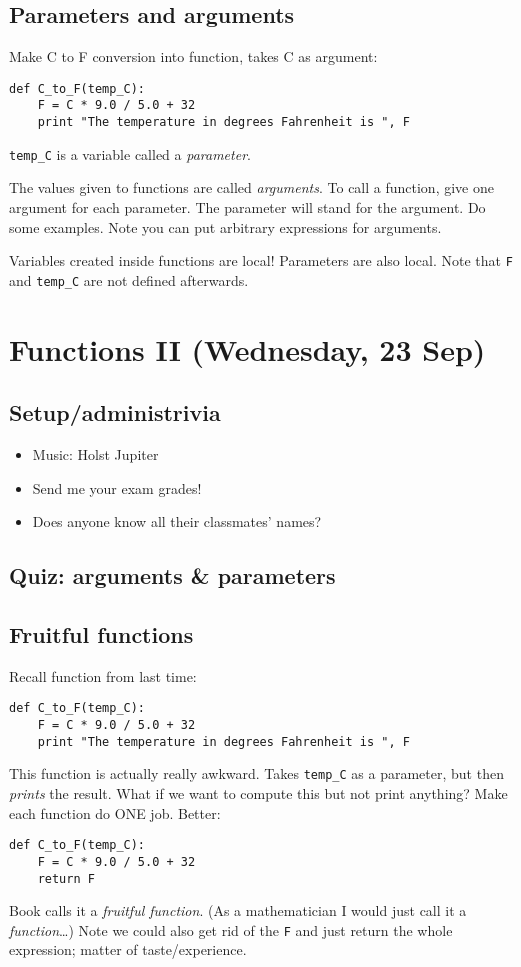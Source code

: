 \documentclass{article}
\begin{document}
\subsection*{Parameters and arguments}

Make C to F conversion into function, takes C as argument:
\begin{verbatim}
def C_to_F(temp_C):
    F = C * 9.0 / 5.0 + 32
    print "The temperature in degrees Fahrenheit is ", F
\end{verbatim}

\verb|temp_C| is a variable called a \emph{parameter}.

The values given to functions are called \emph{arguments}.  To call a
function, give one argument for each parameter.  The parameter will
stand for the argument.  Do some examples.  Note you can put arbitrary
expressions for arguments.

Variables created inside functions are local!  Parameters are also
local. Note that \verb|F| and \verb|temp_C| are not defined afterwards.

\section*{Functions II (Wednesday, 23 Sep)}

\subsection*{Setup/administrivia}
\begin{itemize}
\item Music: Holst Jupiter
\item Send me your exam grades!
\item Does anyone know all their classmates' names?
\end{itemize}

\subsection*{Quiz: arguments \& parameters}

\subsection*{Fruitful functions}

Recall function from last time:
\begin{verbatim}
def C_to_F(temp_C):
    F = C * 9.0 / 5.0 + 32
    print "The temperature in degrees Fahrenheit is ", F
\end{verbatim}
This function is actually really awkward.  Takes \verb|temp_C| as a
parameter, but then \emph{prints} the result.  What if we want to
compute this but not print anything?  Make each function do ONE job.
Better:
\begin{verbatim}
def C_to_F(temp_C):
    F = C * 9.0 / 5.0 + 32
    return F
\end{verbatim}
Book calls it a \emph{fruitful function}.  (As a mathematician I would
just call it a \emph{function}\dots) Note we could also get rid of the
\verb|F| and just return the whole expression; matter of
taste/experience.
\end{document}
